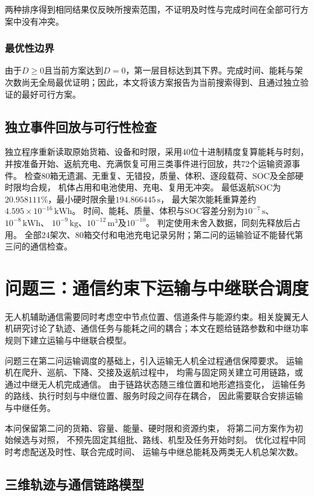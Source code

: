 \documentclass[bwprint]{gmcmthesis}
\begin{document}
两种排序得到相同结果仅反映所搜索范围，不证明及时性与完成时间在全部可行方案中没有冲突。

\subsubsection{最优性边界}
由于$D\geq0$且当前方案达到$D=0$，第一层目标达到其下界。完成时间、能耗与架次数尚无全局最优证明；因此，本文将该方案报告为当前搜索得到、且通过独立验证的最好可行方案。

\subsection{独立事件回放与可行性检查}
独立程序重新读取原始货箱、设备和时限，采用40位十进制精度复算能耗与时刻，
并按准备开始、返航充电、充满恢复可用三类事件进行回放，共72个运输资源事件。
检查80箱无遗漏、无重复、无错投，质量、体积、逐段载荷、SOC及全部硬时限均合规，
机体占用和电池使用、充电、复用无冲突。
最低返航SOC为$20.958111\%$，最小硬时限余量$194.866445\,\mathrm{s}$，
最大架次能耗重算差约$4.595\times10^{-16}\,\mathrm{kWh}$。
时间、能耗、质量、体积与SOC容差分别为$10^{-7}\,\mathrm{s}$、$10^{-8}\,\mathrm{kWh}$、
$10^{-9}\,\mathrm{kg}$、$10^{-12}\,\mathrm{m^3}$及$10^{-10}$。
判定使用未舍入数据，同刻先释放后占用。
全部24架次、80箱交付和电池充电记录另附；第二问的运输验证不能替代第三问的通信检查。

\section{问题三：通信约束下运输与中继联合调度}
无人机辅助通信需要同时考虑空中节点位置、信道条件与能源约束\cite{zeng2016}。相关旋翼无人机研究讨论了轨迹、通信任务与能耗之间的耦合\cite{zeng2019}；本文在题给链路参数和中继功率规则下建立运输与中继联合模型。


问题三在第二问运输调度的基础上，引入运输无人机全过程通信保障要求。
运输机在爬升、巡航、下降、交接及返航过程中，
均需与固定网关建立可用链路，或通过中继无人机完成通信。
由于链路状态随三维位置和地形遮挡变化，
运输任务的路线、执行时刻与中继位置、服务时段之间存在耦合，
因此需要联合安排运输与中继任务。

本问保留第二问的货箱、容量、能量、硬时限和资源约束，
将第二问方案作为初始候选与对照，
不预先固定其组批、路线、机型及任务开始时刻。
优化过程中同时考虑配送及时性、联合完成时间、
运输与中继总能耗及两类无人机总架次数。

\subsection{三维轨迹与通信链路模型}
\end{document}
